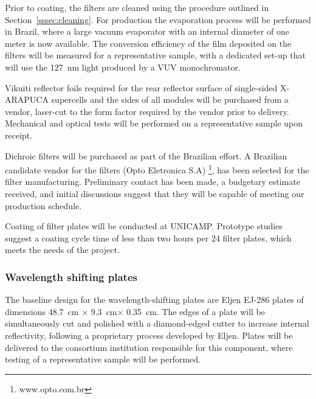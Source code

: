 Prior to coating, the filters are cleaned using the procedure outlined in Section~\ref{sssec:cleaning}.
For  production the evaporation process will be performed
in Brazil, 
where a large vacuum evaporator with an internal diameter of one meter is now available. The conversion efficiency of the film deposited on the filters will be measured for a representative sample, with a dedicated set-up that will use the \SI{127}{nm} light produced by a VUV monochromator.

Vikuiti reflector foils required for the rear reflector surface of single-sided X-ARAPUCA supercells and the sides of all modules will be purchased from a vendor, laser-cut to the form factor required by the vendor prior to delivery.  Mechanical and optical  tests will be performed on a representative sample upon receipt.


Dichroic filters will be purchased as part of the Brazilian effort.  A Brazilian candidate vendor for the filters (Opto Eletronica S.A) \footnote{www.opto.com.br}, has been selected for the filter manufacturing.  Preliminary contact has been made, a budgetary estimate received, and initial discussions suggest that they will be capable of meeting our production schedule.

Coating of filter plates will be conducted at UNICAMP.  Prototype studies suggest a coating cycle time of less than two hours per \num{24} filter plates, which meets the needs of the project.

\subsubsection{Wavelength shifting plates}

The baseline design for the wavelength-shifting plates are %
Eljen EJ-286 plates of dimensions \SI{48.7}{cm} $\times$ \SI{9.3}{cm}$\times$ \SI{0.35}{cm}.  The edges of a plate will be simultaneously cut and polished with a diamond-edged cutter to increase internal reflectivity, following a proprietary process developed by Eljen.  Plates will be delivered to the consortium institution responsible for this component, where  testing of a representative sample will be performed.

